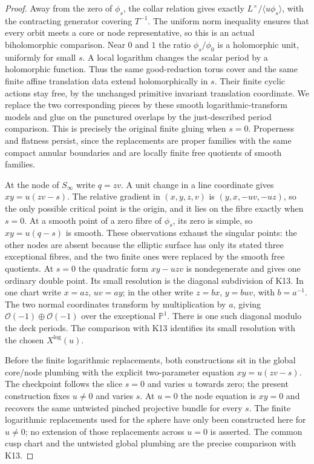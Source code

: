 \begin{proof}
Away from the zero of $\phi_s$, the collar relation gives exactly
$L^\times/\langle u\phi_s\rangle$, with the contracting generator
covering $T^{-1}$. The uniform norm inequality ensures that every
orbit meets a core or node representative, so this is an actual
biholomorphic comparison. Near $0$ and $1$ the ratio
$\phi_s/\phi_0$ is a holomorphic unit, uniformly for small $s$.
A local logarithm changes the scalar period by a holomorphic
function. Thus the same good-reduction torus cover and the same
finite affine translation data extend holomorphically in $s$.
Their finite cyclic actions stay free, by the unchanged primitive
invariant translation coordinate. We replace the two corresponding
pieces by these smooth logarithmic-transform models and glue on
the punctured overlaps by the just-described period comparison.
This is precisely the original finite gluing when $s=0$.
Properness and flatness persist, since the replacements are proper
families with the same compact annular boundaries and are locally
finite free quotients of smooth families.

At the node of $S_\infty$ write $q=zv$. A unit change in a line
coordinate gives $xy=u(zv-s)$. The relative gradient in
$(x,y,z,v)$ is $(y,x,-uv,-uz)$, so the only possible critical point
is the origin, and it lies on the fibre exactly when $s=0$.
At a smooth point of a zero fibre of $\phi_s$, its zero is simple,
so $xy=u(q-s)$ is smooth. These observations exhaust the singular
points: the other nodes are absent because the elliptic surface
has only its stated three exceptional fibres, and the two finite
ones were replaced by the smooth free quotients. At $s=0$ the
quadratic form $xy-uzv$ is nondegenerate and gives one ordinary
double point. Its small resolution is the diagonal subdivision of
K13. In one chart write $x=az$, $uv=ay$; in the other write
$z=bx$, $y=buv$, with $b=a^{-1}$. The two normal coordinates
transform by multiplication by $a$, giving
$\mathcal O(-1)\oplus\mathcal O(-1)$ over the exceptional
$\mathbb P^1$. There is one such diagonal modulo the deck periods.
The comparison with K13 identifies its small resolution with the
chosen $X^{\log}(u)$.

Before the finite logarithmic replacements, both constructions sit in
the global core/node plumbing with the explicit two-parameter equation
$xy=u(zv-s)$. The checkpoint follows the slice $s=0$ and varies
$u$ towards zero; the present construction fixes $u\ne0$ and varies
$s$. At $u=0$ the node equation is $xy=0$ and recovers the same
untwisted pinched projective bundle for every $s$. The finite
logarithmic replacements used for the sphere have only been constructed
here for $u\ne0$; no extension of those replacements across $u=0$
is asserted. The common cusp chart and the untwisted global plumbing
are the precise comparison with K13.
\end{proof}

